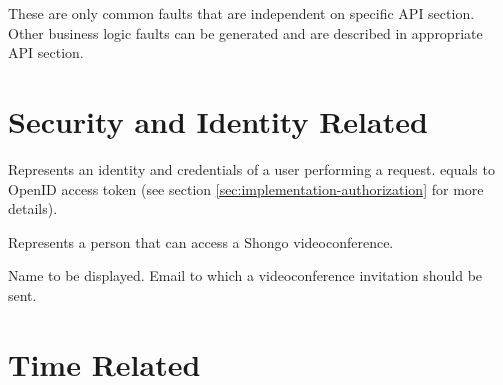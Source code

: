 These are only common faults that are independent on specific API section. Other business logic faults can be generated and are described in appropriate API section.


\section{Security and Identity Related}

\begin{Api}


Represents an identity and credentials of a user performing a request.  equals to OpenID \cite{openid} access token (see section \ref{sec:implementation-authorization} for more details).

Represents a person that can access a Shongo videoconference.
\begin{ApiClassAttributes}
 Name to be displayed.
 Email to which a videoconference invitation should be sent.
\end{ApiClassAttributes}

\end{Api}


\section{Time Related}

